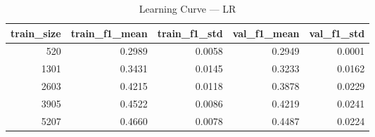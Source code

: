 \begin{table}
\caption{Learning Curve — LR}
\begin{tabular}{rrrrr}
\toprule
train_size & train_f1_mean & train_f1_std & val_f1_mean & val_f1_std \\
\midrule
520 & 0.2989 & 0.0058 & 0.2949 & 0.0001 \\
1301 & 0.3431 & 0.0145 & 0.3233 & 0.0162 \\
2603 & 0.4215 & 0.0118 & 0.3878 & 0.0229 \\
3905 & 0.4522 & 0.0086 & 0.4219 & 0.0241 \\
5207 & 0.4660 & 0.0078 & 0.4487 & 0.0224 \\
\bottomrule
\end{tabular}
\end{table}
